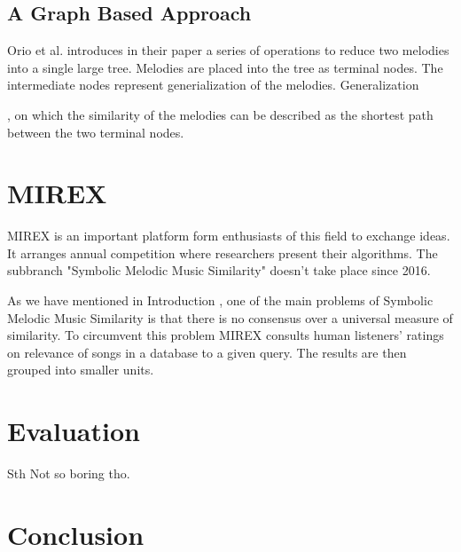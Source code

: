 \documentclass{llncs}
\begin{document}
		\subsection{A Graph Based Approach}

		Orio et al. \cite{two_point_four} introduces in their paper a series of operations to reduce two melodies into a single large tree. Melodies are placed into the tree as terminal nodes. The intermediate nodes represent generialization of the melodies. Generalization 



		, on which the similarity of the melodies can be described as the shortest path between the two terminal nodes.
		
	\section{MIREX}
		MIREX is an important platform form enthusiasts of this field to exchange ideas. It arranges annual competition where researchers present their algorithms. The subbranch "Symbolic Melodic Music Similarity" doesn't take place since 2016. 


		As we have mentioned in Introduction , one of the main problems of Symbolic Melodic Music Similarity is that there is no consensus over a universal measure of similarity. To circumvent this problem MIREX consults human listeners' ratings on relevance of songs in a database to a given query. The results are then grouped into smaller units.  






	\section{Evaluation}
		Sth Not so boring tho.

	\section{Conclusion}

	
\end{document}
